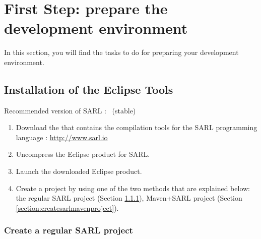 \section{First Step: prepare the development environment}

In this section, you will find the tasks to do for preparing your development environment.

\subsection{Installation of the Eclipse Tools}

\begin{emphbox}
Recommended version of SARL : \sarlversion\ (stable)
\end{emphbox}

\begin{enumerate}
\item Download the  that contains the compilation tools for the SARL programming language : \url{http://www.sarl.io}
\item Uncompress the Eclipse product for SARL.
\item Launch the downloaded Eclipse product.
\item Create a project by using one of the two methods that are explained below: the regular SARL project (Section \ref{section:createsarlproject}),  Maven+SARL project (Section \ref{section:createsarlmavenproject}).
\end{enumerate}

\subsubsection{Create a regular SARL project}\label{section:createsarlproject}

